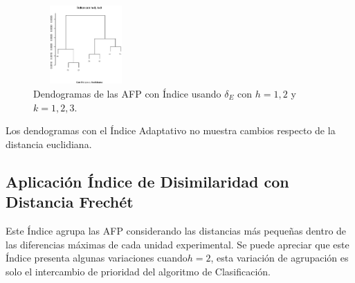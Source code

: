 \begin{figure}[!htp]
\begin{center}
  \includegraphics[height=3cm, width=4cm]{i_euc_h_2_k_3.eps}
   \caption{Dendogramas de las AFP con \'Indice usando $\delta_{E}$ con $h=1,2$ y $k=1,2,3.$}
\label{caja}
\end{center}
\end{figure}

Los dendogramas con el \'Indice Adaptativo no muestra cambios respecto de la distancia eu\-cli\-dia\-na.

\subsection{Aplicaci\'on \'Indice de Disimilaridad con Distancia Frech\'et}

Este \'Indice agrupa las AFP considerando las distancias m\'as peque\~nas dentro de las diferencias m\'aximas de cada unidad experimental. Se puede apreciar que este \'Indice presenta algunas variaciones cuando$h=2$, esta variaci\'on de agrupaci\'on es solo el intercambio de prioridad del algoritmo de Clasificaci\'on.

